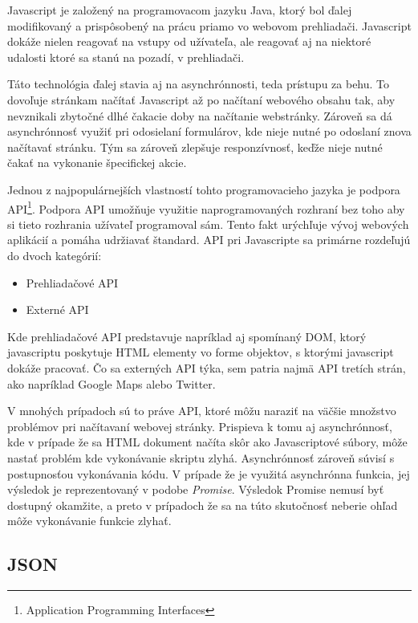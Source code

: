 \bigskip

Javascript je založený na programovacom jazyku Java, ktorý bol ďalej modifikovaný a prispôsobený na prácu priamo vo webovom prehliadači. Javascript dokáže nielen reagovať na vstupy od užívateľa, ale reagovať aj na niektoré udalosti ktoré sa stanú na pozadí, v prehliadači. \cite{Javascript}

Táto technológia ďalej stavia aj na asynchrónnosti, teda prístupu za behu. To dovoľuje stránkam načítať Javascript až po načítaní webového obsahu tak, aby nevznikali zbytočné dlhé čakacie doby na načítanie webstránky. Zároveň sa dá asynchrónnosť využiť pri odosielaní formulárov, kde nieje nutné po odoslaní znova načítavať stránku. Tým sa zároveň zlepšuje responzívnosť, keďže nieje nutné čakať na vykonanie špecifickej akcie. 

Jednou z najpopulárnejších vlastností tohto programovacieho jazyka je podpora API\footnote{Application Programming Interfaces}. Podpora API umožňuje využitie naprogramovaných rozhraní bez toho aby si tieto rozhrania užívateľ programoval sám. Tento fakt urýchľuje vývoj webových aplikácií a pomáha udržiavať štandard. API pri Javascripte sa primárne rozdeľujú do dvoch kategórií:

\begin{itemize}
    \item {Prehliadačové API}
    \item {Externé API}
\end{itemize}

Kde prehliadačové API predstavuje napríklad aj spomínaný DOM, ktorý javascriptu poskytuje HTML elementy vo forme objektov, s ktorými javascript dokáže pracovať. Čo sa externých API týka, sem patria najmä API tretích strán, ako napríklad Google Maps alebo Twitter.

V mnohých prípadoch sú to práve API, ktoré môžu naraziť na väčšie množstvo problémov pri načítavaní webovej stránky. Prispieva k tomu aj asynchrónnosť, kde v prípade že sa HTML dokument načíta skôr ako Javascriptové súbory, môže nastať problém kde vykonávanie skriptu zlyhá. Asynchrónnosť zároveň súvisí s postupnosťou vykonávania kódu. V prípade že je využitá asynchrónna funkcia, jej výsledok je reprezentovaný v podobe \textit{Promise}. Výsledok Promise nemusí byť dostupný okamžite, a preto v prípadoch že sa na túto skutočnosť neberie ohľad môže vykonávanie funkcie zlyhať.\cite{Javascript}

\newpage
\subsection{JSON}

